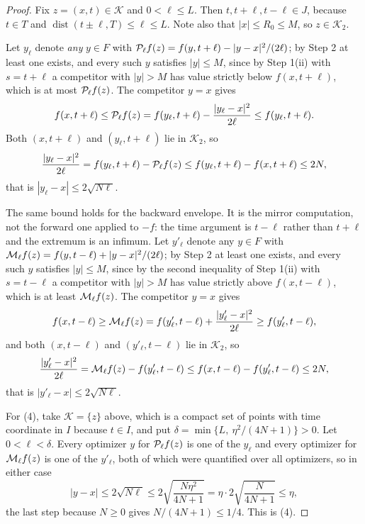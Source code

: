 \begin{proof}
Fix $z=(x,t)\in\mathcal K$ and $0<\ell\le L$. Then $t,t+\ell,t-\ell\in J$,
because $t\in T$ and $\operatorname{dist}(t\pm\ell,T)\le\ell\le L$. Note also
that $|x|\le R_0\le M$, so $z\in\mathcal K_2$.

Let $y_\ell$ denote \emph{any} $y\in F$ with
$\mathcal{P}_\ell f(z)=f(y,t+\ell)-|y-x|^2/(2\ell)$; by Step 2 at least one exists,
and every such $y$ satisfies $|y|\le M$, since by Step 1(ii) with $s=t+\ell$ a
competitor with $|y|>M$ has value strictly below $f(x,t+\ell)$, which is at most
$\mathcal{P}_\ell f(z)$. The competitor $y=x$ gives
\begin{equation}\label{eq:qea-twoside}
  f(x,t+\ell)\le\mathcal{P}_\ell f(z)
    =f(y_\ell,t+\ell)-\frac{|y_\ell-x|^2}{2\ell}\le f(y_\ell,t+\ell).
\end{equation}
Both $(x,t+\ell)$ and $(y_\ell,t+\ell)$ lie in $\mathcal K_2$, so
\begin{equation}\label{eq:qea-collapse}
  \frac{|y_\ell-x|^2}{2\ell}
   =f(y_\ell,t+\ell)-\mathcal{P}_\ell f(z)
   \le f(y_\ell,t+\ell)-f(x,t+\ell)\le2N,
\end{equation}
that is $|y_\ell-x|\le2\sqrt{N\ell}$.

The same bound holds for the backward envelope. It is the mirror computation,
not the forward one applied to $-f$: the time argument is $t-\ell$ rather than
$t+\ell$ and the extremum is an infimum. Let $y'_\ell$ denote any $y\in F$ with
$\mathcal{M}_\ell f(z)=f(y,t-\ell)+|y-x|^2/(2\ell)$; by Step 2 at least one exists,
and every such $y$ satisfies $|y|\le M$, since by the second inequality of
Step 1(ii) with $s=t-\ell$ a competitor with $|y|>M$ has value strictly above
$f(x,t-\ell)$, which is at least $\mathcal{M}_\ell f(z)$. The competitor $y=x$ gives
\begin{equation}\label{eq:qea-twoside-M}
  f(x,t-\ell)\ge\mathcal{M}_\ell f(z)
    =f(y'_\ell,t-\ell)+\frac{|y'_\ell-x|^2}{2\ell}\ge f(y'_\ell,t-\ell),
\end{equation}
and both $(x,t-\ell)$ and $(y'_\ell,t-\ell)$ lie in $\mathcal K_2$, so
\begin{equation}\label{eq:qea-collapse-M}
  \frac{|y'_\ell-x|^2}{2\ell}
   =\mathcal{M}_\ell f(z)-f(y'_\ell,t-\ell)
   \le f(x,t-\ell)-f(y'_\ell,t-\ell)\le2N,
\end{equation}
that is $|y'_\ell-x|\le2\sqrt{N\ell}$.

For (4), take $\mathcal K=\{z\}$ above, which is a compact set of points with
time coordinate in $I$ because $t\in I$, and put
$\delta=\min\{L,\ \eta^2/(4N+1)\}>0$. Let $0<\ell<\delta$. Every optimizer $y$
for $\mathcal{P}_\ell f(z)$ is one of the $y_\ell$ and every optimizer for
$\mathcal{M}_\ell f(z)$ is one of the $y'_\ell$, both of which were quantified over
all optimizers, so in either case
\[
  |y-x|\le2\sqrt{N\ell}\le2\sqrt{\frac{N\eta^2}{4N+1}}
   =\eta\cdot2\sqrt{\frac N{4N+1}}\le\eta ,
\]
the last step because $N\ge0$ gives $N/(4N+1)\le1/4$. This is (4).


\end{proof}
